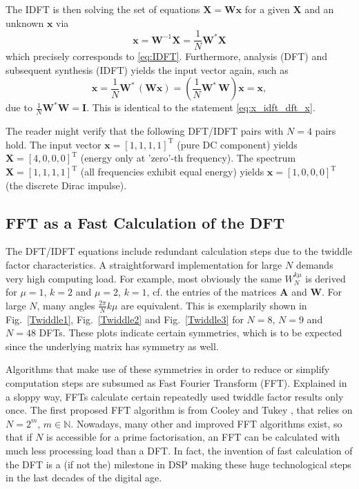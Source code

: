 \documentclass[11pt,a4paper,DIV=12]{scrartcl}
\begin{document}
The IDFT is then solving the set of equations
$\mathbf{X} = \mathbf{W} \mathbf{x}$ for a given $\mathbf{X}$ and an unknown $\mathbf{x}$
via
\begin{equation}
\mathbf{x} = \mathbf{W}^{-1} \mathbf{X} = \frac{1}{N}\mathbf{W}^* \mathbf{X}
\end{equation}
which precisely corresponds to \eqref{eq:IDFT}.
Furthermore, analysis (DFT) and subsequent synthesis (IDFT) yields the input
vector again, such as
\begin{equation}
\mathbf{x} = \frac{1}{N}\mathbf{W}^* \, (\mathbf{W} \mathbf{x}) =
(\frac{1}{N}\mathbf{W}^* \, \mathbf{W}) \mathbf{x} = \mathbf{x},
\end{equation}
due to $\frac{1}{N}\mathbf{W}^* \mathbf{W} = \mathbf{I}$.
This is identical to the statement \eqref{eq:x_idft_dft_x}.

The reader might verify that the following DFT/IDFT pairs with $N=4$ pairs hold.
%
The input vector $\mathbf{x}=[1,1,1,1]^\mathrm{T}$ (pure DC component)
yields $\mathbf{X} = [4,0,0,0]^\mathrm{T}$ (energy only at 'zero'-th frequency).
The spectrum $\mathbf{X} = [1,1,1,1]^\mathrm{T}$ (all frequencies exhibit equal
energy) yields $\mathbf{x} = [1,0,0,0]^\mathrm{T}$ (the discrete Dirac impulse).

\subsection{FFT as a Fast Calculation of the DFT}
The DFT/IDFT equations include redundant calculation steps due to the twiddle
factor characteristics.
%
A straightforward implementation for large $N$ demands very high computing load.
%
For example, most obviously the same $W_N^{k\mu}$ is derived for $\mu=1$, $k=2$
and $\mu=2$, $k=1$, cf. the entries of the matrices $\mathbf{A}$ and $\mathbf{W}$.
%
For large $N$, many angles $\frac{2\pi}{N}k\mu$ are equivalent.
%
This is exemplarily shown in Fig.~\ref{Twiddle1}, Fig.~\ref{Twiddle2} and
Fig.~\ref{Twiddle3} for $N=8$, $N=9$ and $N=48$ DFTs.
%
These plots indicate certain symmetries, which is to be expected since the
underlying matrix has symmetry as well.

Algorithms that make use of these symmetries in order to reduce or simplify
computation steps are subsumed as Fast Fourier Transform (FFT).
%
Explained in a sloppy way, FFTs calculate certain repeatedly used twiddle factor
results only once.
%
The first proposed FFT algorithm is from Cooley and Tukey \cite{Cooley1965},
that relies on $N=2^m$, $m\in\mathbb{N}$.
%
Nowadays, many other and improved FFT algorithms exist, so that if $N$
is accessible for a prime factorisation, an FFT can be calculated with much less
processing load than a DFT.
%
In fact, the invention of fast calculation of the DFT is a (if not the)
milestone in DSP making these huge technological steps in the last decades of the
digital age.
\end{document}
